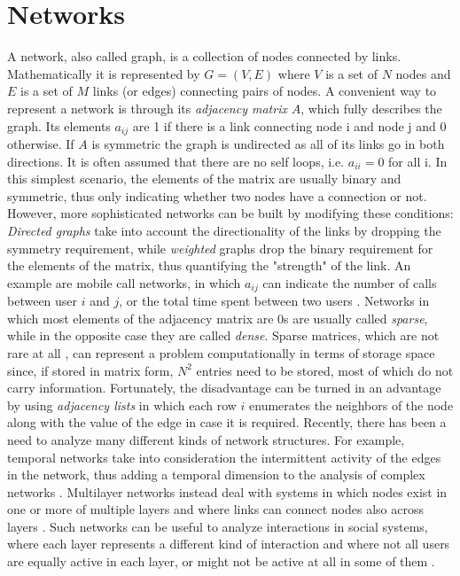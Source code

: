 \section{Networks}
A network, also called graph, is a collection of nodes connected by links. Mathematically it is represented
by $G = (V, E)$ where $V$ is a set of $N$ nodes and $E$ is a set of $M$ links (or edges) connecting pairs of nodes. 
A convenient way to represent a network is through its \textit{adjacency matrix} $A$, which fully describes the graph.  Its
elements $a_{ij}$ are 1 if there is a link connecting node i and node j and 0 otherwise. If
$A$ is symmetric the graph is undirected as all of its links go in both directions. It is often assumed that there are no self loops, i.e. $a_{ii}=0$
for all i. In this simplest scenario, the elements of the matrix are usually binary and symmetric, thus only indicating whether two nodes have a connection or not.
However, more sophisticated networks can be built by modifying these conditions:
\textit{Directed graphs} take into account the directionality of the links by dropping the symmetry requirement, while \textit{weighted} graphs drop the binary requirement
for the elements of the matrix, thus quantifying the "strength" of the link. An example are mobile call networks, in which $a_{ij}$ can indicate the number
of calls between user $i$ and $j$, or the total time spent between two users \cite{Onnela01052007}. Networks in which most elements of the adjacency matrix
are 0s are usually called \textit{sparse}, while in the opposite case they are called \textit{dense}. Sparse matrices, which
are not rare at all \cite{Davis:2011:UFS:2049662.2049663}, can represent a problem computationally
in terms of storage space since, if stored in matrix form, $N^{2}$ entries need to be stored, most of which do not carry information.
Fortunately, the disadvantage can be turned in an advantage by using \textit{adjacency lists} in which each row $i$ enumerates
the neighbors of the node along with the value of the edge in case it is required. 
Recently, there has been a need to analyze many different kinds of network structures. For example, temporal networks take into consideration the intermittent activity of the edges in the network, thus adding 
a temporal dimension to the analysis of complex networks \cite{Holme201297}. Multilayer networks instead deal with
systems in which nodes exist in one or more of multiple layers and where links can connect nodes also across layers \cite{Kivela2014,Boccaletti2014}.
Such networks can be useful to analyze interactions in social systems, where each layer represents a different kind of interaction and where
not all users are equally active in each layer, or might not be active at all in some of them \cite{Szell03082010}.





